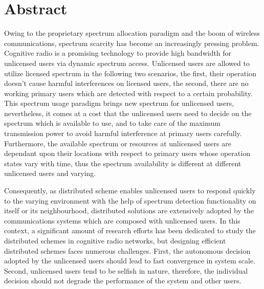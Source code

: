 \chapter{Abstract}
Owing to the proprietary spectrum allocation paradigm and the boom of wireless communications, spectrum scarcity has become an increasingly pressing problem. 
Cognitive radio is a promising technology to provide high bandwidth for unlicensed users via dynamic spectrum access. 
Unlicensed users are allowed to utilize licensed spectrum in the following two scenarios, the first, their operation doesn't cause harmful interferences on licensed users, the second, there are no working primary users which are detected with respect to a certain probability.
This spectrum usage paradigm brings new spectrum for unlicensed users, nevertheless, it comes at a cost that the unlicensed users need to decide on the spectrum which is available to use, and to take care of the maximum transmission power to avoid harmful interference at primary users carefully.
Furthermore, the available spectrum or resources at unlicensed users are dependant upon their locations with respect to primary users whose operation states vary with time, thus the spectrum availability is different at different unlicensed users and varying.

Consequently, as distributed scheme enables unlicensed users to respond quickly to the varying environment with the help of spectrum detection functionality on itself or its neighbourhood, distributed solutions are extensively adopted by the communications systems which are composed with unlicensed users.
In this context, a significant amount of research efforts has been dedicated to study the distributed schemes in cognitive radio networks, but designing efficient distributed schemes faces numerous challenges.
First, the autonomous decision adopted by the unlicensed users should lead to fast convergence in system scale.
Second, unlicensed users tend to be selfish in nature, therefore, the individual decision should not degrade the performance of the system and other users.

